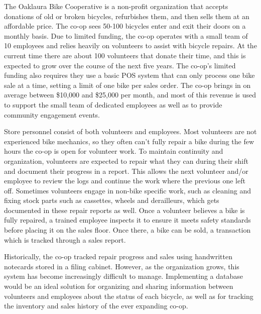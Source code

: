 \documentclass{article}
\begin{document}
\begin{tcolorbox}[colback=secondarycolor, colframe=primarycolor, arc=5mm]
\begingroup
\large
The Oaklaura Bike Cooperative is a non-profit organization that accepts donations of old or broken bicycles, refurbishes them, and then sells them at an affordable price. The co-op sees 50-100 bicycles enter and exit their doors on a monthly basis. Due to limited funding, the co-op operates with a small team of 10 employees and relies heavily on volunteers to assist with bicycle repairs. At the current time there are about 100 volunteers that donate their time, and this is expected to grow over the course of the next five years. The co-op’s limited funding also requires they use a basic POS system that can only process one bike sale at a time, setting a limit of one bike per sales order. The co-op brings in on average between \$10,000 and \$25,000 per month, and most of this revenue is used to support the small team of dedicated employees as well as to provide community engagement events. 

\vspace{0.2cm}

Store personnel consist of both volunteers and employees. Most volunteers are not experienced bike mechanics, so they often can't fully repair a bike during the few hours the co-op is open for volunteer work. To maintain continuity and organization, volunteers are expected to repair what they can during their shift and document their progress in a report. This allows the next volunteer and/or employee to review the logs and continue the work where the previous one left off. Sometimes volunteers engage in non-bike specific work, such as cleaning and fixing stock parts such as cassettes, wheels and derailleurs, which gets documented in these repair reports as well. Once a volunteer believes a bike is fully repaired, a trained employee inspects it to ensure it meets safety standards before placing it on the sales floor. Once there, a bike can be sold, a transaction which is tracked through a sales report.

\vspace{0.2cm}

Historically, the co-op tracked repair progress and sales using handwritten notecards stored in a filing cabinet. However, as the organization grows, this system has become increasingly difficult to manage. Implementing a database would be an ideal solution for organizing and sharing information between volunteers and employees about the status of each bicycle, as well as for tracking the inventory and sales history of the ever expanding co-op.

\endgroup
\end{tcolorbox}
\end{document}
